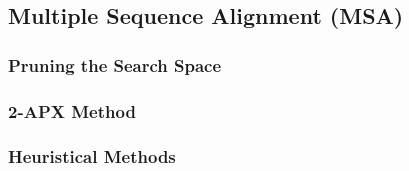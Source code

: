 \hypertarget{multiple-sequence-alignment-msa}{%
\subsection{Multiple Sequence Alignment (MSA)}\label{multiple-sequence-alignment-msa}}

\hypertarget{pruning-the-search-space}{%
\subsubsection{Pruning the Search Space}\label{pruning-the-search-space}}

\hypertarget{apx-method}{%
\subsubsection{2-APX Method}\label{apx-method}}

\hypertarget{heuristical-methods}{%
\subsubsection{Heuristical Methods}\label{heuristical-methods}}
